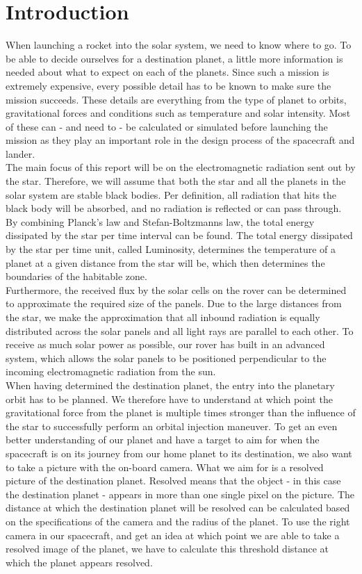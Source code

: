 \documentclass[reprint,english,notitlepage]{revtex4-2}
\begin{document}
\section{Introduction} \label{sec:introduction}
When launching a rocket into the solar system, we need to know where to go.
To be able to decide ourselves for a destination planet, a little more information is needed about what to expect on each of the planets.
Since such a mission is extremely expensive, every possible detail has to be known to make sure the mission succeeds.
These details are everything from the type of planet to orbits, gravitational forces and conditions such as temperature and solar intensity.
Most of these can - and need to - be calculated or simulated before launching the mission as they play an important role in the design process of the spacecraft and lander.\\
The main focus of this report will be on the electromagnetic radiation sent out by the star.
Therefore, we will assume that both the star and all the planets in the solar system are stable black bodies.
Per definition, all radiation that hits the black body will be absorbed, and no radiation is reflected or can pass through.\\
By combining Planck's law and Stefan-Boltzmanns law, the total energy dissipated by the star per time interval can be found.
The total energy dissipated by the star per time unit, called Luminosity, determines the temperature of a planet at a given distance from the star will be, which then determines the boundaries of the habitable zone.\\
Furthermore, the received flux by the solar cells on the rover can be determined to approximate the required size of the panels.
Due to the large distances from the star, we make the approximation that all inbound radiation is equally distributed across the solar panels and all light rays are parallel to each other.
To receive as much solar power as possible, our rover has built in an advanced system, which allows the solar panels to be positioned perpendicular to the incoming electromagnetic radiation from the sun.\\
When having determined the destination planet, the entry into the planetary orbit has to be planned.
We therefore have to understand at which point the gravitational force from the planet is multiple times stronger than the influence of the star to successfully perform an orbital injection maneuver.
To get an even better understanding of our planet and have a target to aim for when the spacecraft is on its journey from our home planet to its destination, we also want to take a picture with the on-board camera.
What we aim for is a resolved picture of the destination planet.
Resolved means that the object - in this case the destination planet - appears in more than one single pixel on the picture.
The distance at which the destination planet will be resolved can be calculated based on the specifications of the camera and the radius of the planet.
To use the right camera in our spacecraft, and get an idea at which point we are able to take a resolved image of the planet, we have to calculate this threshold distance at which the planet appears resolved.
\end{document}
